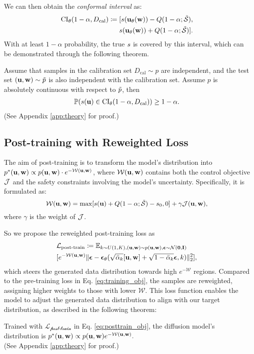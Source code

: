 We can then obtain the \textit{conformal interval} as:
\begin{align}
\notag
\textrm{CI}_\theta(1-\alpha,D_\textrm{cal})\coloneqq[s(\mathbf{u}_\theta(\mathbf{w}))-Q(1-\alpha;\Tilde{\mathcal{S}}), \\ 
s(\mathbf{u}_\theta(\mathbf{w}))+Q(1-\alpha;\Tilde{\mathcal{S}})]. 
\end{align}
With at least $1-\alpha$ probability, the true $s$ is covered by this interval, which can be demonstrated through the following theorem.
\begin{theorem}
     Assume that samples in the calibration set $D_\textrm{cal}\sim p$ are independent, and the test set $(\mathbf{u},\mathbf{w})\sim \Tilde{p}$ is also independent with the calibration set. Assume $p$ is absolutely continuous with respect to $\Tilde{p}$, then
     \begin{align}
         \mathbb{P}(s(\mathbf{u})\in\textrm{CI}_\theta(1-\alpha,D_\textrm{cal})) \geq 1-\alpha.
     \end{align}
     (See Appendix \ref{app:theory} for proof.)
\end{theorem}

\subsection{Post-training with Reweighted Loss}
\label{sec:posttrain}

The aim of post-training is to transform the model’s distribution into $p^*(\mathbf{u},\mathbf{w})\propto p(\mathbf{u},\mathbf{w}) \cdot e^{-\mathcal{W}(\mathbf{u},\mathbf{w})}$, where $\mathcal{W}(\mathbf{u}, \mathbf{w})$ contains both the control objective $\mathcal{J}$ and the safety constraints involving the model's uncertainty. Specifically, it is formulated as:
\begin{equation}
\scalebox{0.97}{$ \mathcal{W}(\u,\w) = \max[\score(\u)+Q(1-\alpha;\Tilde{\S})-\score_0, 0] + \gamma\J(\u,\w), $}
    \label{eq:w}
\end{equation}
where $\gamma$ is the weight of $\mathcal{J}$.

So we propose the reweighted post-training loss as 
\begin{align}
&\mathcal{L_\textrm{post-train}}\coloneqq\mathbb{E}_{k\sim U(1,K),(\mathbf{u},\mathbf{w})\sim p(\mathbf{u},\mathbf{w}),\bm{\epsilon}\sim \mathcal{N}(\mathbf{0},\mathbf{I})} \notag \\ 
&[e^{-\mathcal{W}(\mathbf{u},\mathbf{w})}\|\mathbf{\bm{\epsilon}} - \bm{\epsilon}_\theta(\sqrt{\bar{\alpha}_k}[\mathbf{u},\mathbf{w}] + \sqrt{1-\bar{\alpha}_k} \bm{\epsilon},k)\|_2^2],
\label{eq:posttrain_obj}
\end{align}
which steers the generated data distribution towards high $e^{-\mathcal{W}}$ regions. Compared to the pre-training loss in Eq. \ref{eq:training_obj}, the samples are reweighted, assigning higher weights to those with lower $\mathcal{W}$. This loss function enables the model to adjust the generated data distribution to align with our target distribution, as described in the following theorem:
\begin{theorem}
    Trained with $\mathcal{L_\textrm{post-train}}$ in Eq. \ref{eq:posttrain_obj}, the diffusion model's distribution is $p^*(\mathbf{u},\mathbf{w})\propto p(\mathbf{u},\mathbf{w}) e^{-\mathcal{W}(\mathbf{u},\mathbf{w})}.$\\
    (See Appendix \ref{app:theory} for proof.)
\end{theorem}

